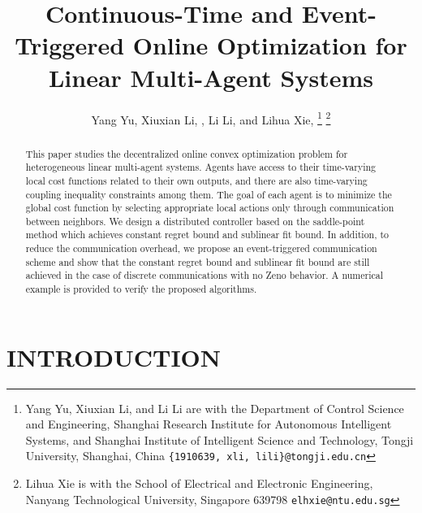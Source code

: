 \documentclass[letterpaper, 10 pt, conference]{ieeeconf}  %
\title{\LARGE \bf
Continuous-Time and Event-Triggered Online Optimization for Linear Multi-Agent Systems
}
\author{Yang Yu, Xiuxian Li, \IEEEmembership{Senior Member, IEEE}, Li Li, and Lihua Xie, \IEEEmembership{Fellow, IEEE}%
\thanks{Yang Yu, Xiuxian Li, and Li Li are with the Department of Control Science and Engineering, Shanghai Research Institute for Autonomous Intelligent Systems, and Shanghai Institute of Intelligent Science and Technology, Tongji University, Shanghai, China {\tt\small \{1910639, xli, lili\}@tongji.edu.cn}}
\thanks{Lihua Xie is with the School of Electrical and Electronic Engineering, Nanyang Technological University, Singapore 639798 {\tt\small elhxie@ntu.edu.sg}}}
\begin{document}
\maketitle
\thispagestyle{empty}
\pagestyle{empty}


\begin{abstract}

This paper studies the decentralized online convex optimization problem for heterogeneous linear multi-agent systems. Agents have access to their time-varying local cost functions related to their own outputs, and there are also time-varying coupling inequality constraints among them. The goal of each agent is to minimize the global cost function by selecting appropriate local actions only through communication between neighbors. We design a distributed controller based on the saddle-point method which achieves constant regret bound and sublinear fit bound. In addition, to reduce the communication overhead, we propose an event-triggered communication scheme and show that the constant regret bound and sublinear fit bound are still achieved in the case of discrete communications with no Zeno behavior. A numerical example is provided to verify the proposed algorithms.


\end{abstract}


\section{INTRODUCTION}
\end{document}
